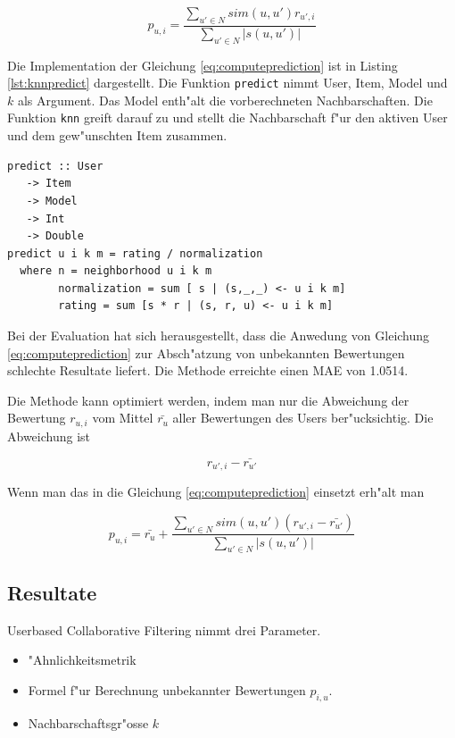 \documentclass[a4paper, 12pt]{article}
\begin{document}
\begin{equation}
  \label{eq:computeprediction}
  p_{u,i} = \frac{\sum_{u' \in N}{sim(u,u') r_{u',i}}}{\sum_{u' \in N}{|s(u,u')|}}
\end{equation}

Die Implementation der Gleichung \ref{eq:computeprediction} ist in Listing \ref{lst:knnpredict} dargestellt. Die Funktion \verb|predict| nimmt User, Item, Model und $k$ als Argument. Das Model enth"alt die vorberechneten Nachbarschaften. Die Funktion \verb|knn| greift darauf zu und stellt die Nachbarschaft f"ur den aktiven User und dem gew"unschten Item zusammen.

\begin{lstlisting}[caption=Berechnung von $p_{u,i}$, label=lst:knnpredict]
  predict :: User
   -> Item
   -> Model
   -> Int
   -> Double
predict u i k m = rating / normalization
  where n = neighborhood u i k m
        normalization = sum [ s | (s,_,_) <- u i k m]
        rating = sum [s * r | (s, r, u) <- u i k m]
\end{lstlisting}

Bei der Evaluation hat sich herausgestellt, dass die Anwedung von Gleichung \ref{eq:computeprediction} zur Absch"atzung von unbekannten Bewertungen schlechte Resultate liefert. Die Methode erreichte einen MAE von 1.0514. 

Die Methode kann optimiert werden, indem man nur die Abweichung der Bewertung $r_{u,i}$ vom Mittel $\bar{r_u}$  aller Bewertungen des Users ber"ucksichtig. Die Abweichung ist

\begin{equation}
  \label{eq:dev2}
r_{u',i} - \bar{r_{u'}}
\end{equation}

Wenn man das in die Gleichung \ref{eq:computeprediction} einsetzt erh"alt man

\begin{equation}
  \label{eq:optcomputeprediction}
  p_{u,i} = \bar{r_u} + \frac{\sum_{u' \in N}{sim(u,u') (r_{u',i} - \bar{r_{u'}})}}{\sum_{u' \in N}{|s(u,u')|}}
\end{equation}

\subsection{Resultate}
\label{sec:userbasedresults}

Userbased Collaborative Filtering nimmt drei Parameter.
\begin{itemize}
\item "Ahnlichkeitsmetrik
\item Formel f"ur Berechnung unbekannter Bewertungen $p_{i,u}$.
\item Nachbarschaftsgr"osse $k$
\end{itemize}
\end{document}
